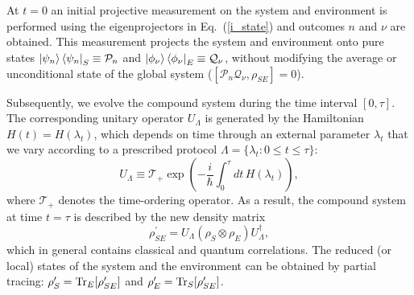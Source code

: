 \documentclass[aps,prx,twocolumn,showpacs,floatfix,superscriptaddress,graphics,longbibliography]{revtex4-1}
\newcommand{\HAT}{}
\begin{document}
At $t=0$ an initial projective measurement on the system and environment is performed using the eigenprojectors in Eq.~(\ref{i_state}) and outcomes $n$ and $\nu$ are obtained. 
This measurement projects the system and environment onto pure states $\ket{\psi_n}\bra{\psi_n}_S \equiv \HAT{\mathcal{P}}_n$ and $\ket{\phi_\nu}\bra{\phi_\nu}_E \equiv \HAT{\mathcal{Q}}_\nu$, without modifying the average or unconditional  state of the global system ($[{\mathcal P}_n{\mathcal Q}_\nu,\rho_{SE}]=0$).

Subsequently, we evolve the compound system during the time interval $[0, \tau]$. The corresponding unitary operator $U_{\Lambda}$ is generated by the Hamiltonian $H(t)=H(\lambda_t)$, which depends on time 
through an external parameter $\lambda_t$ that we vary according to a prescribed protocol $\Lambda = \{ \lambda_t : 0 \leq t \leq \tau \}$:
\begin{equation}\label{unitary}
 \HAT{U}_{\Lambda} \equiv \mathcal{T}_{+} \exp\left(- \frac{i}{\hbar}\int_{0}^{\tau} dt\, \HAT{H}(\lambda_t) \right),
\end{equation}
where $\mathcal{T}_{+}$ denotes the time-ordering operator. 
As a result, the compound system at time $t=\tau$ is described by the new density matrix
\begin{equation}\label{f_state}
\rho_{SE}^\prime = \HAT{U}_{\Lambda} (\rho_S \otimes \rho_E) \HAT{U}_{\Lambda}^\dagger,
\end{equation}
which in general contains classical and quantum correlations. 
The reduced (or local) states of the system and the environment can be obtained by partial tracing:
$\rho_S' = {\rm Tr}_E [\rho_{SE}']$ and $\rho_E^\prime = {\rm Tr}_S [\rho_{SE}']$. 
\end{document}
